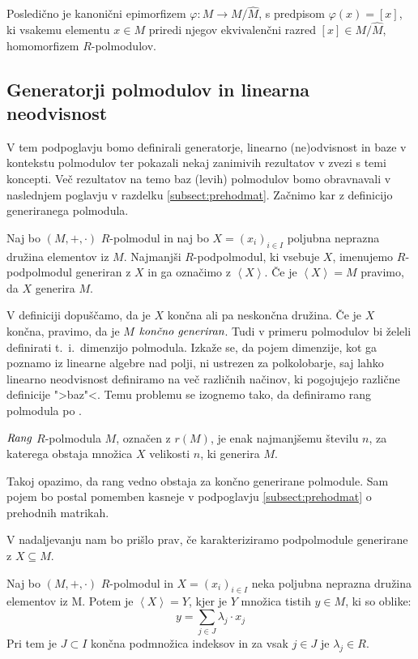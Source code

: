 \documentclass[mat1]{fmfdelo}
\newcommand{\pojem}[1]{\ensuremath{\emph{#1}}}
\newcommand{\map}[3]{\ensuremath{{#1}:{#2}\rightarrow{#3}}}
\newcommand{\Gen}[1]{\ensuremath{\left<{#1}\right>}}
\begin{document}
Posledično je kanonični epimorfizem $\map{\varphi}{M}{M/\widehat{M}}$, s predpisom $\varphi(x) = [x]$, ki vsakemu elementu $x\in M$ priredi njegov ekvivalenčni razred $[x]\in M/\widehat{M}$, homomorfizem $R$-polmodulov.

\subsection{Generatorji polmodulov in linearna neodvisnost} \label{subsect:base}
V tem podpoglavju bomo definirali generatorje, linearno (ne)odvisnost in baze v kontekstu polmodulov ter pokazali nekaj zanimivih rezultatov v zvezi s temi koncepti. Več rezultatov na temo baz (levih) polmodulov bomo obravnavali v naslednjem poglavju v razdelku \ref{subsect:prehodmat}. Začnimo kar z definicijo generiranega polmodula.
\begin{definicija}
	Naj bo $(M, +, \cdot)$ $R$-polmodul in naj bo $X = (x_i)_{i\in I}$ poljubna neprazna družina elementov iz $M$. Najmanjši $R$-podpolmodul, ki vsebuje $X$, imenujemo $R$-podpolmodul generiran z $X$ in ga označimo z \Gen{X}. Če je $\Gen{X} = M$ pravimo, da $X$ generira $M$.
\end{definicija}

	V definiciji dopuščamo, da je $X$ končna ali pa neskončna družina. Če je $X$ končna, pravimo, da je $M$ \pojem{končno generiran}. Tudi v primeru polmodulov bi želeli definirati t.~i.\ dimenzijo polmodula. Izkaže se, da pojem dimenzije, kot ga poznamo iz linearne algebre nad polji, ni ustrezen za polkolobarje, saj lahko linearno neodvisnost definiramo na več različnih načinov, ki pogojujejo različne definicije ">baz"<. Temu problemu se izognemo tako, da definiramo rang polmodula po \cite[str. 3--4]{bib:Tanbase}.

\begin{definicija}\label{def:rang}
	\pojem{Rang} $R$-polmodula $M$, označen z $r(M)$, je enak najmanjšemu številu $n$, za katerega obstaja množica $X$ velikosti $n$, ki generira $M$.
\end{definicija}

Takoj opazimo, da rang vedno obstaja za končno generirane polmodule. Sam pojem bo postal pomemben kasneje v podpoglavju \ref{subsect:prehodmat} o prehodnih matrikah.

V nadaljevanju nam bo prišlo prav, če karakteriziramo podpolmodule generirane z $X\subseteq M$.

\begin{trditev}
	Naj bo $(M, +, \cdot)$ $R$-polmodul in $X = (x_i)_{i\in I}$ neka poljubna neprazna družina elementov iz M. Potem je $\Gen{X} = Y$, kjer je $Y$  množica tistih $y\in M$, ki so oblike: $$ y = \sum_{j\in J} \lambda_j \cdot x_j$$ Pri tem je $J\subset I$ končna podmnožica indeksov in za vsak $j\in J$ je $\lambda_j \in R$.
\end{trditev}
\end{document}
